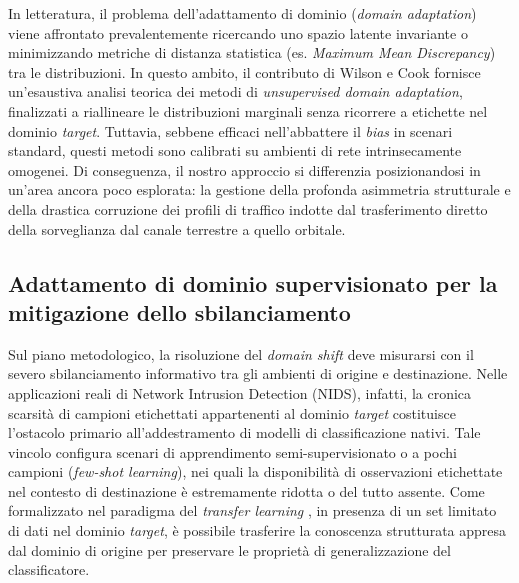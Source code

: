 In letteratura, il problema dell'adattamento di dominio (\textit{domain adaptation}) viene affrontato prevalentemente ricercando uno spazio latente invariante o minimizzando metriche di distanza statistica (es. \textit{Maximum Mean Discrepancy}) tra le distribuzioni. 
In questo ambito, il contributo di Wilson e Cook \cite{wilson2020} fornisce un'esaustiva analisi teorica dei metodi di \textit{unsupervised domain adaptation}, finalizzati a riallineare le distribuzioni marginali senza ricorrere a etichette nel dominio \textit{target}. 
Tuttavia, sebbene efficaci nell'abbattere il \textit{bias} in scenari standard, questi metodi sono calibrati su ambienti di rete intrinsecamente omogenei. 
Di conseguenza, il nostro approccio si differenzia posizionandosi in un'area ancora poco esplorata: la gestione della profonda asimmetria strutturale e della drastica corruzione dei profili di traffico indotte dal trasferimento diretto della sorveglianza dal canale terrestre a quello orbitale.

\subsection{Adattamento di dominio supervisionato per la mitigazione dello sbilanciamento}
\label{subsec:supervised_da_nids}

Sul piano metodologico, la risoluzione del \textit{domain shift} deve misurarsi con il severo sbilanciamento informativo tra gli ambienti di origine e destinazione. 
Nelle applicazioni reali di Network Intrusion Detection (NIDS), infatti, la cronica scarsità di campioni etichettati appartenenti al dominio \textit{target} costituisce l'ostacolo primario all'addestramento di modelli di classificazione nativi. 
Tale vincolo configura scenari di apprendimento semi-supervisionato o a pochi campioni (\textit{few-shot learning}), nei quali la disponibilità di osservazioni etichettate nel contesto di destinazione è estremamente ridotta o del tutto assente. 
Come formalizzato nel paradigma del \textit{transfer learning} \cite{pan2010}, in presenza di un set limitato di dati nel dominio \textit{target}, è possibile trasferire la conoscenza strutturata appresa dal dominio di origine per preservare le proprietà di generalizzazione del classificatore.

